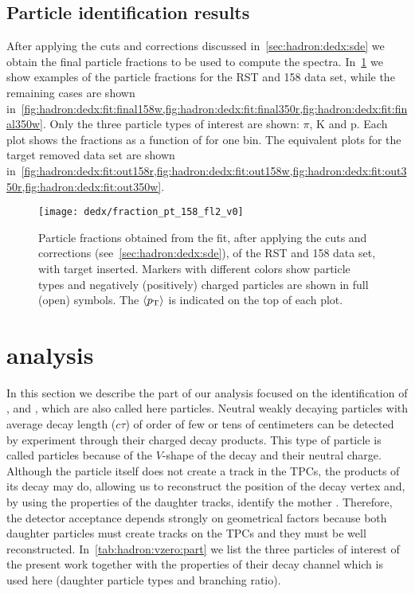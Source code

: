 \subsection{\boldmath Particle identification results}
\label{sec:hadron:dedx:results}

After applying the cuts and corrections discussed
in~\cref{sec:hadron:dedx:sde} we obtain the final
particle fractions to be used to compute the spectra.
In~\cref{fig:hadron:dedx:fit:final158r} we show examples
of the particle fractions for the RST and 158 \GeVc data set,
while the remaining cases are shown 
in~\cref{fig:hadron:dedx:fit:final158w,fig:hadron:dedx:fit:final350r,fig:hadron:dedx:fit:final350w}.
Only the three particle types of interest are shown: $\pi$, $\text{K}$ and $\text{p}$.
Each plot shows the fractions as a function of \pp for one \pT bin.
The equivalent plots for the target removed data set are shown
in~\cref{fig:hadron:dedx:fit:out158r,fig:hadron:dedx:fit:out158w,fig:hadron:dedx:fit:out350r,fig:hadron:dedx:fit:out350w}.

\begin{figure}
  \centering
  \texttt{[image: dedx/fraction\_pt\_158\_fl2\_v0]}
  \caption{Particle fractions obtained from the \dedx fit,
    after applying the cuts and corrections (see~\cref{sec:hadron:dedx:sde}),
    of the RST and 158 \GeVc data set, with target inserted. Markers with different
    colors show particle types and negatively (positively) charged particles are shown
    in full (open) symbols. The $\langle p_\text{T}\rangle$ is indicated on the top of each plot.}
  \label{fig:hadron:dedx:fit:final158r}
\end{figure}

\clearpage

\section{\boldmath \vzero analysis}
\label{sec:hadron:vzero}

In this section we describe the part of our analysis
focused on the identification of \lamb, \antilamb and \kzeros,
which are also called here \vzero particles.
Neutral weakly decaying particles with average decay length ($c\tau$)
of order of few or tens of centimeters can be detected by \NASixtyOne
experiment through their charged decay products. This type of
particle is called \vzero particles because of the $V$-shape of
the decay and their neutral charge. Although the \vzero
particle itself does not create a track in the TPCs, the products
of its decay may do, allowing us to reconstruct the position of the
decay vertex and, by using the properties of the daughter tracks,
identify the mother \vzero. Therefore, the detector acceptance
depends strongly on geometrical factors because both daughter particles
must create tracks on the TPCs and they must be well reconstructed. 
In~\cref{tab:hadron:vzero:part} we list the three \vzero particles of interest
of the present work together with the properties of their decay channel
which is used here (daughter particle types and branching ratio). 

